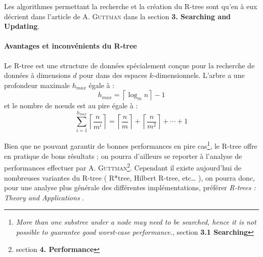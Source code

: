 Les algorithmes permettant la recherche et la création du R-tree sont qu'en à eux décrient dans l'article de \textsc{A. Guttman} dans la section \textbf{3. Searching and Updating}\cite{Guttman}.

\paragraph{Avantages et inconvénients du R-tree} Le R-tree est une structure de données spécialement conçue pour la recherche de données à dimensions $d$ pour dans des espaces $k$-dimensionnels. L'arbre a une profondeur maximale $h_{max}$ égale à :
\begin{equation}
 h_{max} = \left\lceil\log_{m} n\right\rceil - 1
\end{equation}
et le nombre de nœuds est au pire égale à :
\begin{equation}
 \sum_{i=1}^{h_{max}}{\left\lceil\frac{n}{m^i}\right\rceil} = \left\lceil\frac{n}{m}\right\rceil + \left\lceil\frac{n}{m^2}\right\rceil + \cdots + 1
\end{equation}

 Bien que ne pouvant garantir de bonnes performances en pire cas\footnote{\og \emph{More than one substree under a node may need to be searched, hence it is not possible to guarantee good worst-case performance.}\fg{}\cite{Guttman}, section \textbf{3.1 Searching}}, le R-tree offre en pratique de bons résultats ; on pourra d'ailleurs se reporter à l'analyse de performances effectuer par A. \textsc{Guttman}\footnote{section \textbf{4. Performance}\cite{Guttman}}. Cependant il existe aujourd'hui de nombreuses variantes du R-tree ( R*tree, Hilbert R-tree, etc\dots{} ), on pourra donc, pour une analyse plus générale des différentes implémentations, préférer \og\emph{R-trees : Theory and Applications} \fg{}\cite{poulos}.
